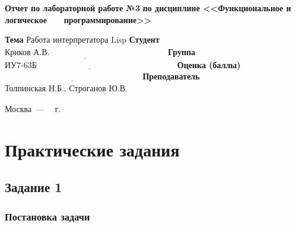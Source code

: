 \documentclass[12pt]{report}
\begin{document}
\begin{titlepage}
		\begin{center}
			\noindent\begin{minipage}{1.1\textwidth}\centering
				\Large\textbf{  Отчет по лабораторной работе №3}\newline
				\textbf{по дисциплине <<Функциональное и логическое}\newline
				\textbf{~~~программирование>>}\newline\newline
			\end{minipage}
		\end{center}
		
		\noindent\textbf{Тема} $\underline{\text{Работа интерпретатора Lisp}}$\newline\newline
		\noindent\textbf{Студент} $\underline{\text{Криков А.В.~~~~~~~~~~~~~~~~~~~~~~~~~~~~~~~~~~~~~~~~~~}}$\newline\newline
		\noindent\textbf{Группа} $\underline{\text{ИУ7-63Б~~~~~~~~~~~~~~~~~~~~~~~~~~~~~~~~~~~~~~~~~~~~~~~~~~}}$\newline\newline
		\noindent\textbf{Оценка (баллы)} $\underline{\text{~~~~~~~~~~~~~~~~~~~~~~~~~~~~~~~~~~~~~~~~~~~~~~~~~}}$\newline\newline
		\noindent\textbf{Преподаватель} $\underline{\text{Толпинская Н.Б., Строганов Ю.В.~~~~~~~~~~~~~~~~~~~~~~~~~~~~}}$\newline\newline\newline
		
		\begin{center}
			\vfill
			Москва~---~\the\year
			~г.
		\end{center}
	\end{titlepage}
	
	


\chapter*{Практические задания}

\section*{Задание 1}
\subsection*{Постановка задачи}
	
\end{document}
